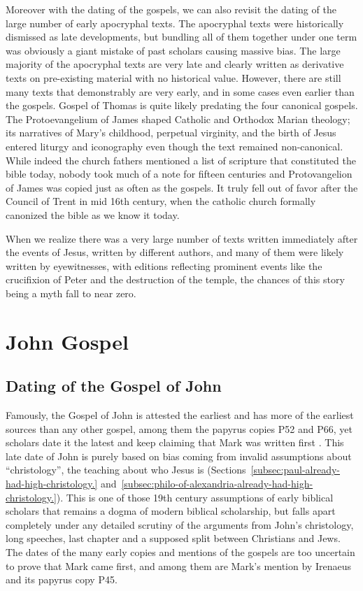 Moreover with the dating of the gospels, we can also revisit the dating of the large number of early apocryphal texts.
The apocryphal texts were historically dismissed as late developments, but bundling all of them together under one term was obviously a giant mistake of past scholars causing massive bias.
The large majority of the apocryphal texts are very late and clearly written as derivative texts on pre-existing material with no historical value.
However, there are still many texts that demonstrably are very early, and in some cases even earlier than the gospels.
Gospel of Thomas is quite likely predating the four canonical gospels.
The Protoevangelium of James shaped Catholic and Orthodox Marian theology; its narratives of Mary's childhood, perpetual virginity, and the birth of Jesus entered liturgy and iconography even though the text remained non-canonical.
While indeed the church fathers mentioned a list of scripture that constituted the bible today, nobody took much of a note for fifteen centuries and Protovangelion of James was copied just as often as the gospels.
It truly fell out of favor after the Council of Trent in mid 16th century, when the catholic church formally canonized the bible as we know it today.

When we realize there was a very large number of texts written immediately after the events of Jesus, written by different authors, and many of them were likely written by eyewitnesses, with editions reflecting prominent events like the crucifixion of Peter and the destruction of the temple, the chances of this story being a myth fall to near zero.

\section{John Gospel}\label{sec:john-gospel}

\subsection{Dating of the Gospel of John}\label{subsec:dating-of-the-gospel-of-john}

Famously, the Gospel of John is attested the earliest and has more of the earliest sources than any other gospel, among them the papyrus copies P52 and P66, yet scholars date it the latest and keep claiming that Mark was written first \cite{hengel:fourgospels}.
This late date of John is purely based on bias coming from invalid assumptions about ``christology'', the teaching about who Jesus is (Sections~\ref{subsec:paul-already-had-high-christology.} and~\ref{subsec:philo-of-alexandria-already-had-high-christology.}).
This is one of those 19th century assumptions of early biblical scholars \cite{schweitzer:quest} that remains a dogma of modern biblical scholarship, but falls apart completely under any detailed scrutiny of the arguments from John's christology, long speeches, last chapter and a supposed split between Christians and Jews.
The dates of the many early copies and mentions of the gospels are too uncertain to prove that Mark came first, and among them are Mark's mention by Irenaeus \cite[3.1.1]{irenaeus:advhaer} and its papyrus copy P45.

